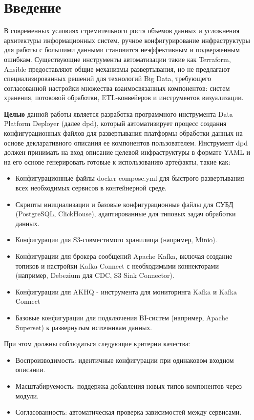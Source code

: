 \chapter*{Введение} %
В современных условиях стремительного роста объемов данных и усложнения архитектуры информационных систем,
ручное конфигурирование инфраструктуры для работы с большими данными становится неэффективным и подверженным ошибкам.
Существующие инструменты автоматизации такие как Terraform, Ansible предоставляют общие механизмы развертывания,
но не предлагают специализированных решений для технологий Big Data, требующего согласованной настройки множества взаимосвязанных компонентов:
систем хранения, потоковой обработки, ETL-конвейеров и инструментов визуализации.

\textbf{Целью} данной работы является разработка программного инструмента Data Platform Deployer (далее dpd),
который автоматизирует процесс создания конфигурационных файлов для развертывания платформы обработки данных
на основе декларативного описания ее компонентов пользователем. Инструмент dpd должен принимать на вход описание целевой инфраструктуры
в формате YAML и на его основе генерировать готовые к использованию артефакты, такие как:

\begin{itemize}
	\item Конфигурационные файлы docker-compose.yml для быстрого развертывания всех необходимых сервисов в контейнерной среде.
	\item Скрипты инициализации и базовые конфигурационные файлы для СУБД (PostgreSQL, ClickHouse), адаптированные для типовых задач обработки данных.
	\item Конфигурации для S3-совместимого хранилища (например, Minio).
	\item Конфигурации для брокера сообщений Apache Kafka, включая создание топиков и настройки Kafka Connect с необходимыми коннекторами (например, Debezium для CDC, S3 Sink Connector).
	\item Конфигурации для AKHQ - инструмента для мониторинга Kafka и Kafka Connect
	\item Базовые конфигурации для подключения BI-систем (например, Apache Superset) к развернутым источникам данных.
\end{itemize}



При этом должны соблюдаться следующие критерии качества:
\begin{itemize}
	\item Воспроизводимость: идентичные конфигурации при одинаковом входном описании.
	\item Масштабируемость: поддержка добавления новых типов компонентов через модули.
	\item Согласованность: автоматическая проверка зависимостей между сервисами.
\end{itemize}

